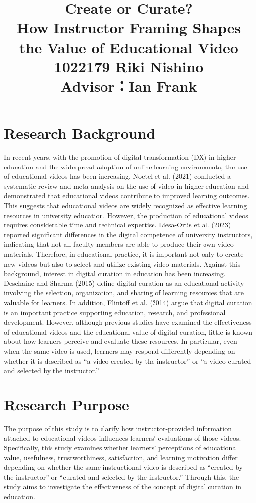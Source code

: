 \documentclass[a4paper,11pt]{article}
\title{Create or Curate?\\ How Instructor Framing Shapes the Value of Educational Video\\
\large  1022179 Riki Nishino\\
Advisor：Ian Frank}
\author{}
\date{}
\begin{document}
\maketitle

\section{Research Background}

In recent years, with the promotion of digital transformation (DX) in higher education and the widespread adoption of online learning environments, the use of educational videos has been increasing. Noetel et al. (2021) conducted a systematic review and meta-analysis on the use of video in higher education and demonstrated that educational videos contribute to improved learning outcomes. This suggests that educational videos are widely recognized as effective learning resources in university education.
However, the production of educational videos requires considerable time and technical expertise. Liesa-Orús et al. (2023) reported significant differences in the digital competence of university instructors, indicating that not all faculty members are able to produce their own video materials. Therefore, in educational practice, it is important not only to create new videos but also to select and utilize existing video materials.
Against this background, interest in digital curation in education has been increasing. Deschaine and Sharma (2015) define digital curation as an educational activity involving the selection, organization, and sharing of learning resources that are valuable for learners. In addition, Flintoff et al. (2014) argue that digital curation is an important practice supporting education, research, and professional development.
However, although previous studies have examined the effectiveness of educational videos and the educational value of digital curation, little is known about how learners perceive and evaluate these resources. In particular, even when the same video is used, learners may respond differently depending on whether it is described as “a video created by the instructor” or “a video curated and selected by the instructor.”

\section{Research Purpose}

The purpose of this study is to clarify how instructor-provided information attached to educational videos influences learners’ evaluations of those videos.
Specifically, this study examines whether learners’ perceptions of educational value, usefulness, trustworthiness, satisfaction, and learning motivation differ depending on whether the same instructional video is described as “created by the instructor” or “curated and selected by the instructor.”
Through this, the study aims to investigate the effectiveness of the concept of digital curation in education.
\end{document}
